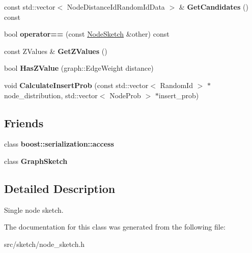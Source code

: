 \begin{DoxyCompactItemize}
\item 
\hypertarget{classall__distance__sketch_1_1NodeSketch_aab453f65996756b68a45d1773a401f3c}{}const std\+::vector$<$ Node\+Distance\+Id\+Random\+Id\+Data $>$ \& {\bfseries Get\+Candidates} () const \label{classall__distance__sketch_1_1NodeSketch_aab453f65996756b68a45d1773a401f3c}

\item 
\hypertarget{classall__distance__sketch_1_1NodeSketch_af2e6e41daf345e722eb46aed1333e7d8}{}bool {\bfseries operator==} (const \hyperlink{classall__distance__sketch_1_1NodeSketch}{Node\+Sketch} \&other) const \label{classall__distance__sketch_1_1NodeSketch_af2e6e41daf345e722eb46aed1333e7d8}

\item 
\hypertarget{classall__distance__sketch_1_1NodeSketch_ac2f6c35d3a99dbe26192a796ea783bfe}{}const Z\+Values \& {\bfseries Get\+Z\+Values} ()\label{classall__distance__sketch_1_1NodeSketch_ac2f6c35d3a99dbe26192a796ea783bfe}

\item 
\hypertarget{classall__distance__sketch_1_1NodeSketch_a2ae23f00223064c83bad0f18d3f3f1bd}{}bool {\bfseries Has\+Z\+Value} (graph\+::\+Edge\+Weight distance)\label{classall__distance__sketch_1_1NodeSketch_a2ae23f00223064c83bad0f18d3f3f1bd}

\item 
\hypertarget{classall__distance__sketch_1_1NodeSketch_a2596a7734b00e9807f1d4e1cbfe2dcaf}{}void {\bfseries Calculate\+Insert\+Prob} (const std\+::vector$<$ Random\+Id $>$ $\ast$node\+\_\+distribution, std\+::vector$<$ Node\+Prob $>$ $\ast$insert\+\_\+prob)\label{classall__distance__sketch_1_1NodeSketch_a2596a7734b00e9807f1d4e1cbfe2dcaf}

\end{DoxyCompactItemize}
\subsection*{Friends}
\begin{DoxyCompactItemize}
\item 
\hypertarget{classall__distance__sketch_1_1NodeSketch_ac98d07dd8f7b70e16ccb9a01abf56b9c}{}class {\bfseries boost\+::serialization\+::access}\label{classall__distance__sketch_1_1NodeSketch_ac98d07dd8f7b70e16ccb9a01abf56b9c}

\item 
\hypertarget{classall__distance__sketch_1_1NodeSketch_af8070bfbe7b00c7838a9a7605e361af2}{}class {\bfseries Graph\+Sketch}\label{classall__distance__sketch_1_1NodeSketch_af8070bfbe7b00c7838a9a7605e361af2}

\end{DoxyCompactItemize}


\subsection{Detailed Description}
Single node sketch. 

The documentation for this class was generated from the following file\+:\begin{DoxyCompactItemize}
\item 
src/sketch/node\+\_\+sketch.\+h\end{DoxyCompactItemize}

